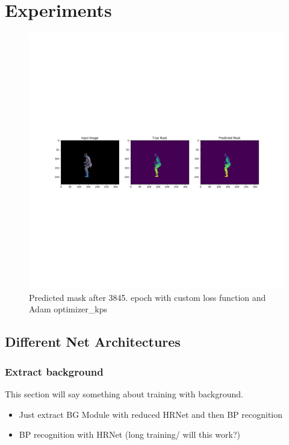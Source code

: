 

\chapter{Experiments} %

\label{Experiments} %

\begin{figure}[H]
    \centering
    \includegraphics[width=\textwidth,height=\textheight,keepaspectratio]{img/adam_prediction_3845_train.png}
    \decoRule
    \caption[Predicted Mask]{Predicted mask after 3845. epoch with custom loss function and Adam optimizer_kps}
    \label{fig:adam-prediction}
\end{figure}


\section{Different Net Architectures}

\subsection{Extract background }
This section will say something about training with background.
\begin{itemize}
    \item Just extract BG Module with reduced HRNet and then BP recognition
    \item BP recognition with HRNet (long training/ will this work?)
\end{itemize}

